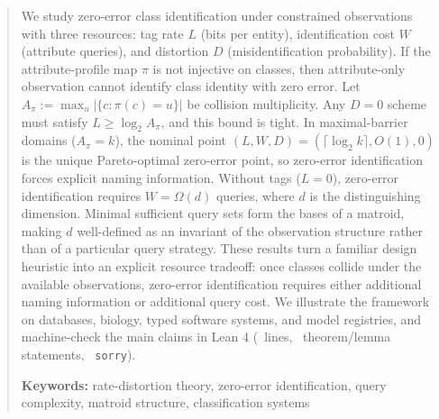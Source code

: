 \begin{abstract}
We study zero-error class identification under constrained observations with three resources: tag rate $L$ (bits per entity), identification cost $W$ (attribute queries), and distortion $D$ (misidentification probability). If the attribute-profile map $\pi$ is not injective on classes, then attribute-only observation cannot identify class identity with zero error. Let $A_\pi := \max_u |\{c : \pi(c)=u\}|$ be collision multiplicity. Any $D=0$ scheme must satisfy $L \ge \log_2 A_\pi$, and this bound is tight. In maximal-barrier domains ($A_\pi=k$), the nominal point $(L,W,D)=(\lceil\log_2 k\rceil,O(1),0)$ is the unique Pareto-optimal zero-error point, so zero-error identification forces explicit naming information. Without tags ($L=0$), zero-error identification requires $W=\Omega(d)$ queries, where $d$ is the distinguishing dimension. Minimal sufficient query sets form the bases of a matroid, making $d$ well-defined as an invariant of the observation structure rather than of a particular query strategy. These results turn a familiar design heuristic into an explicit resource tradeoff: once classes collide under the available observations, zero-error identification requires either additional naming information or additional query cost. We illustrate the framework on databases, biology, typed software systems, and model registries, and machine-check the main claims in Lean 4 (\LeanTotalLines\ lines, \LeanTotalTheorems\ theorem/lemma statements, \LeanTotalSorry\ \texttt{sorry}).

\textbf{Keywords:} rate-distortion theory, zero-error identification, query complexity, matroid structure, classification systems
\end{abstract}
